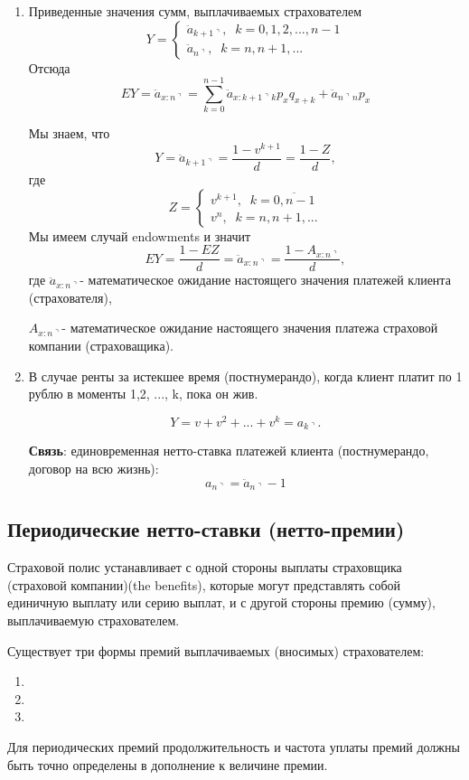 \begin{enumerate}
	\item {}
	Приведенные значения сумм, выплачиваемых страхователем
	\[
		Y=\begin{cases}
			\ddot{a}_{k+1\urcorner}, \;\; k=0,1,2,...,n-1\\
			\ddot{a}_{n\urcorner}, \;\; k=n,n+1,...
		\end{cases}
	\]
	Отсюда
	\[ EY = \ddot{a}_{x:n\urcorner}=\sum\limits_{k=0}^{n-1}\ddot{a}_{x:k+1\urcorner}{}_kp_xq_{x+k}+\ddot{a}_{n\urcorner}{}_np_x \]

	Мы знаем, что 
	\[
		Y = \ddot{a}_{k+1\urcorner}=\frac{1-v^{k+1}}{d}=\frac{1-Z}{d},
	\]
	где
	\[
		Z=\begin{cases}
			v^{k+1}, \;\;k=\overline{0,n-1}\\
			v^n, \;\;k=n,n+1,...
		\end{cases}
	\]
	Мы имеем случай endowments и значит 
	\[ EY = \frac{1-EZ}{d}=\ddot{a}_{x:n\urcorner}=\frac{1- A_{x:n\urcorner}}{d}, \]
	где $ \ddot{a}_{x:n\urcorner}$- математическое ожидание настоящего значения платежей клиента (страхователя),

	$ A_{x:n\urcorner}$- математическое ожидание настоящего значения платежа страховой компании (страховащика).

	\item В случае ренты за истекшее время (постнумерандо), когда клиент платит по 1 рублю в моменты 1,2, ..., k, пока он жив.

	\[ Y = v+v^2+...+v^k = a_{k\urcorner}.\]

	\textbf{Связь}: единовременная нетто-ставка платежей клиента (постнумерандо, договор на всю жизнь):
	\[ a_{n\urcorner} = \ddot{a}_{n\urcorner} - 1 \]
\end{enumerate}

\subsection{Периодические нетто-ставки (нетто-премии)} %

Страховой полис устанавливает с одной стороны выплаты страховщика (страховой компании)(the benefits), которые могут представлять собой единичную выплату или серию выплат, и с другой стороны премию (сумму), выплачиваемую страхователем.

Существует три формы премий выплачиваемых (вносимых) страхователем:
\begin{enumerate}
	\item {}
	\item {}
	\item {}
\end{enumerate}
Для периодических премий продолжительность и частота уплаты премий должны быть точно определены в дополнение к величине премии.


